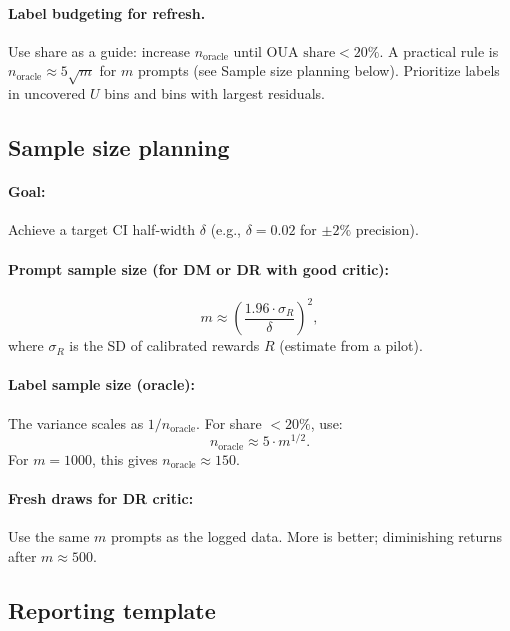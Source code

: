 \paragraph{Label budgeting for refresh.}
Use \oua{} share as a guide: increase $n_{\text{oracle}}$ until $\text{OUA share} < 20\%$.
A practical rule is $n_{\text{oracle}} \approx 5\sqrt{m}$ for $m$ prompts (see Sample size planning below).
Prioritize labels in uncovered $U$ bins and bins with largest residuals.

\subsection{Sample size planning}

\paragraph{Goal:} Achieve a target CI half-width $\delta$ (e.g., $\delta = 0.02$ for $\pm 2\%$ precision).

\paragraph{Prompt sample size (for DM or DR with good critic):}
\begin{equation}
m \approx \left( \frac{1.96 \cdot \sigma_R}{\delta} \right)^2,
\end{equation}
where $\sigma_R$ is the SD of calibrated rewards $R$ (estimate from a pilot).

\paragraph{Label sample size (oracle):}
The \oua{} variance scales as $1 / n_{\text{oracle}}$. For \oua{} share $< 20\%$, use:
\begin{equation}
n_{\text{oracle}} \approx 5 \cdot m^{1/2}.
\end{equation}
For $m = 1000$, this gives $n_{\text{oracle}} \approx 150$.

\paragraph{Fresh draws for DR critic:}
Use the same $m$ prompts as the logged data. More is better; diminishing returns after $m \approx 500$.

\subsection{Reporting template}

